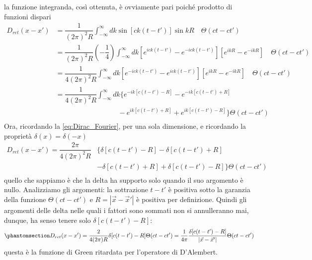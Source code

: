 la funzione integranda, così ottenuta, è ovviamente pari poiché prodotto di funzioni dispari
\begin{equation}
   \begin{aligned}
        D_{ret}(x-x')&=\dfrac{1}{(2\pi)^2R}\int_{-\infty}^\infty dk\sin{[ck(t-t')]} \sin{kR}  \quad\Theta(ct-ct')\\
        &=\dfrac{1}{(2\pi)^2R}\left(-\dfrac{1}{4}\right)\int_{-\infty}^\infty dk [e^{ick(t-t')}-e^{-ick(t-t')}][e^{ikR}-e^{-ikR}]  \quad\Theta(ct-ct')\\
        &=\dfrac{1}{4(2\pi)^2R}\int_{-\infty}^\infty dk [e^{-ick(t-t')}-e^{ick(t-t')}][e^{ikR}-e^{-ikR}]  \quad\Theta(ct-ct')\\
         &=\dfrac{1}{4(2\pi)^2R}\int_{-\infty}^\infty dk \{e^{-ik[c(t-t')-R]}-e^{-ik[c(t-t')+R]}\\&\qquad \qquad\qquad\qquad\quad-e^{ik[c(t-t')+R]}+e^{ik[c(t-t')-R]} \}\Theta(ct-ct')\\
   \end{aligned}
\end{equation}
Ora, ricordando la \eqref{eq:Dirac_Fourier}, per una sola dimensione, e ricordando la proprietà $\delta(x)=\delta(-x)$
\begin{equation}
   \begin{aligned}
        D_{ret}(x-x')=\dfrac{2\pi}{4(2\pi)^2R}&\{ \delta[c(t-t')-R]-\delta[c(t-t')+R]\\
       & -\delta[c(t-t')+R]+\delta[c(t-t')-R] \}\Theta(ct-ct')\\
   \end{aligned}
\end{equation}
quello che sappiamo è che la delta ha supporto solo quando il suo argomento è nullo. Analizziamo gli argomenti: la sottrazione $t-t'$ è positiva sotto la garanzia della funzione $\Theta(ct-ct')$ e $R=|\Vec{x}-\Vec{x}'|$ è positiva per definizione. Quindi gli argomenti delle delta nelle quali i fattori sono sommati non si annulleranno mai, dunque, ha senso tenere solo $\delta[c(t-t')-R]$:
\begin{equation}\phantomsection\label{eq:Green_ret}
        D_{ret}(x-x')=\dfrac{2}{4(2\pi)R}\delta[c(t-t')-R]\Theta(ct-ct')=\dfrac{1}{4\pi}\dfrac{\delta[c(t-t')-R]}{|\Vec{x}-\Vec{x}'|}\Theta(ct-ct')
\end{equation}
questa è la funzione di Green ritardata per l'operatore di D'Alembert.

